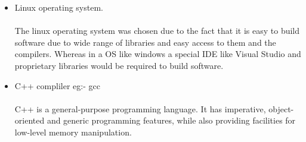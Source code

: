 \documentclass[11pt]{report}
\begin{document}
\begin{itemize}
    \item Linux operating system.
    \\
    \\The linux operating system was chosen due to the fact that it is easy to build software due to wide range of libraries and easy access to them and the compilers. Whereas in a OS like windows a special IDE like Visual Studio and proprietary libraries would be required to build software.
    \item C++ compliler eg:- gcc
    \\
    \\C++ is a general-purpose programming language. It has imperative, object-oriented and generic programming features, while also providing facilities for low-level memory manipulation.


\end{itemize}
\end{document}

